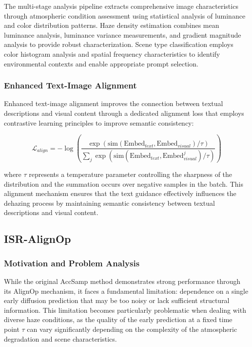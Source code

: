 \documentclass{article}
\begin{document}
The multi-stage analysis pipeline extracts comprehensive image characteristics through atmospheric condition assessment using statistical analysis of luminance and color distribution patterns. Haze density estimation combines mean luminance analysis, luminance variance measurements, and gradient magnitude analysis to provide robust characterization. Scene type classification employs color histogram analysis and spatial frequency characteristics to identify environmental contexts and enable appropriate prompt selection.

\subsubsection{Enhanced Text-Image Alignment}

Enhanced text-image alignment improves the connection between textual descriptions and visual content through a dedicated alignment loss that employs contrastive learning principles to improve semantic consistency:

\begin{equation}
\mathcal{L}_{align} = -\log\left(\frac{\exp(\text{sim}(\text{Embed}_{text}, \text{Embed}_{visual})/\tau)}{\sum_{j} \exp(\text{sim}(\text{Embed}_{text}, \text{Embed}_{visual}^j)/\tau)}\right)
\end{equation}

where $\tau$ represents a temperature parameter controlling the sharpness of the distribution and the summation occurs over negative samples in the batch. This alignment mechanism ensures that the text guidance effectively influences the dehazing process by maintaining semantic consistency between textual descriptions and visual content.

\subsection{ISR-AlignOp}

\subsubsection{Motivation and Problem Analysis}

While the original AccSamp method demonstrates strong performance through its AlignOp mechanism, it faces a fundamental limitation: dependence on a single early diffusion prediction that may be too noisy or lack sufficient structural information. This limitation becomes particularly problematic when dealing with diverse haze conditions, as the quality of the early prediction at a fixed time point $\tau$ can vary significantly depending on the complexity of the atmospheric degradation and scene characteristics.
\end{document}
